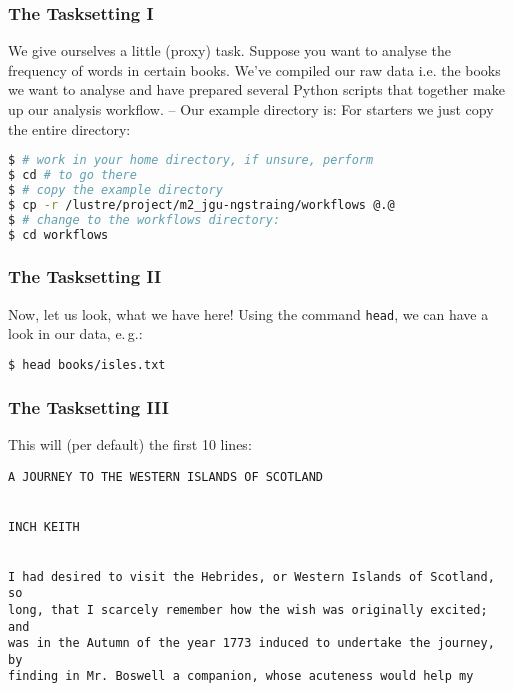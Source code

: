 \begin{frame}[fragile]
  \frametitle{The Tasksetting I}
  We give ourselves a little (proxy) task. Suppose you want to analyse the frequency of words in certain books.\newline
  \pause
  We’ve compiled our raw data i.e. the books we want to analyse and have prepared several Python scripts that together make up our analysis workflow. -- Our example directory is:
  \pathtoexercise{}\newline
  For starters we just copy the entire directory:
  \begin{lstlisting}[language=Bash, style=Shell]
$ # work in your home directory, if unsure, perform
$ cd # to go there
$ # copy the example directory
$ cp -r /lustre/project/m2_jgu-ngstraing/workflows @.@
$ # change to the workflows directory:
$ cd workflows
  \end{lstlisting}
\end{frame}

\begin{frame}[fragile]
  \frametitle{The Tasksetting II}
  Now, let us look, what we have here!\newline
  Using the command \texttt{head}, we can have a look in our data, e.\,g.:
  \begin{lstlisting}[language=Bash, style=Shell, basicstyle=\ttfamily\footnotesize]
$ head books/isles.txt
  \end{lstlisting}
\end{frame}

\begin{frame}[fragile]
  \frametitle{The Tasksetting III}
  This will (per default) the first 10 lines:
  \begin{lstlisting}[style=Plain, basicstyle=\ttfamily\tiny]
A JOURNEY TO THE WESTERN ISLANDS OF SCOTLAND


INCH KEITH


I had desired to visit the Hebrides, or Western Islands of Scotland, so
long, that I scarcely remember how the wish was originally excited; and
was in the Autumn of the year 1773 induced to undertake the journey, by
finding in Mr. Boswell a companion, whose acuteness would help my
  \end{lstlisting}
  \pause
\end{frame}

